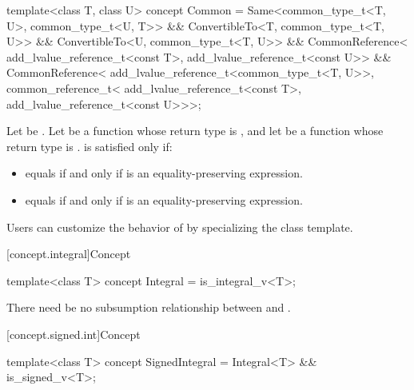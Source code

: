 %
\begin{itemdecl}
template<class T, class U>
concept Common =
  Same<common_type_t<T, U>, common_type_t<U, T>> &&
  ConvertibleTo<T, common_type_t<T, U>> &&
  ConvertibleTo<U, common_type_t<T, U>> &&
  CommonReference<
    add_lvalue_reference_t<const T>,
    add_lvalue_reference_t<const U>> &&
  CommonReference<
    add_lvalue_reference_t<common_type_t<T, U>>,
    common_reference_t<
      add_lvalue_reference_t<const T>,
      add_lvalue_reference_t<const U>>>;
\end{itemdecl}

\begin{itemdescr}
\pnum
Let  be . Let
 be a function whose return type is , and let  be a
function whose return type is .  is
satisfied only if:
\begin{itemize}
\item {} equals  if and only if
   is an equality-preserving
  expression.
\item {} equals  if and only if
   is an equality-preserving
  expression.
\end{itemize}

\pnum
\begin{note}
Users can customize the behavior of  by specializing the
 class template.
\end{note}

\end{itemdescr}

[concept.integral]{Concept }

%
\begin{itemdecl}
template<class T>
concept Integral = is_integral_v<T>;
\end{itemdecl}

\begin{itemdescr}
\pnum
There need be no subsumption relationship between
and
.
\end{itemdescr}

[concept.signed.int]{Concept }

%
\begin{itemdecl}
template<class T>
concept SignedIntegral = Integral<T> && is_signed_v<T>;
\end{itemdecl}

